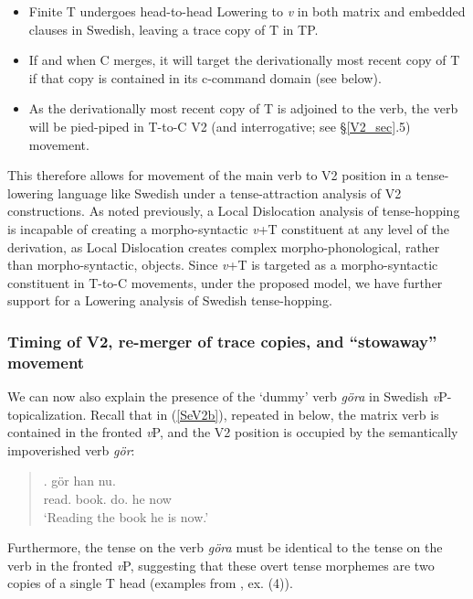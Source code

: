 \singlespacing
\begin{samepage}
\begin{itemize}
\item Finite T undergoes head-to-head Lowering to {\it v} in both matrix and embedded clauses in Swedish, leaving a trace copy of T in TP.
\item If and when C\raisebox{-3pt}{\footnotesize{[-T]}} merges, it will target the derivationally most recent copy of T if that copy is contained in its c-command domain (see below).
\item As the derivationally most recent copy of T is adjoined to the verb, the verb will be pied-piped in T-to-C V2 (and interrogative; see \S\ref{V2_sec}.5) movement.

\end{itemize}
\end{samepage}
\onehalfspacing
This therefore allows for movement of the main verb to V2 position in a tense-lowering language like Swedish under a tense-attraction analysis of V2 constructions. As noted previously, a Local Dislocation analysis of tense-hopping is incapable of creating a morpho-syntactic {\it v}+T constituent at any level of the derivation, as Local Dislocation creates complex morpho-phonological, rather than morpho-syntactic, objects. Since {\it v}+T is targeted as a morpho-syntactic constituent in T-to-C movements, under the proposed model, we have further support for a Lowering analysis of Swedish tense-hopping.\\

\subsubsection{Timing of V2, re-merger of trace copies, and ``stowaway'' movement}

\noindent
We can now also explain the presence of the `dummy' verb \textit{g\"{o}ra} in Swedish \textit{v}P-topicalization. Recall that in (\ref{SeV2b}), repeated in \Next below, the matrix verb is contained in the fronted \textit{v}P, and the V2 position is occupied by the semantically impoverished verb \textit{g\"{o}r}:

\singlespacing
\begin{quote}
\begin{minipage}{5.5in}
\exg.  g\"{o}r han nu.\label{SeV2_repeatb}\\
\hspace{1pt} read. book. do. he now\\
`Reading the book he is now.' 

\end{minipage}
\end{quote}
\onehalfspacing
Furthermore, the tense on the verb \textit{g\"{o}ra} must be identical to the tense on the verb in the fronted \textit{v}P, suggesting that these overt tense morphemes are two copies of a single T head (examples from , ex. (4)).\\


